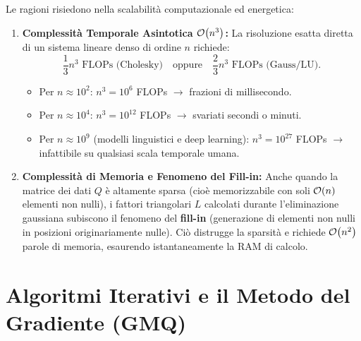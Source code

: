 Le ragioni risiedono nella scalabilit\`a computazionale ed energetica:
\begin{enumerate}
    \item \textbf{Complessit\`a Temporale Asintotica $\mathcal{O}\!\left(n^3\right)$:}
    La risoluzione esatta diretta di un sistema lineare denso di ordine $n$ richiede:
    \begin{equation}
        \frac{1}{3} n^3 \text{ FLOPs (Cholesky)} \quad \text{oppure} \quad \frac{2}{3} n^3 \text{ FLOPs (Gauss/LU)}.
    \end{equation}
    \begin{itemize}
        \item Per $n \approx 10^2$: $n^3 = 10^6$ FLOPs $\longrightarrow$ frazioni di millisecondo.
        \item Per $n \approx 10^4$: $n^3 = 10^{12}$ FLOPs $\longrightarrow$ svariati secondi o minuti.
        \item Per $n \approx 10^9$ (modelli linguistici e deep learning): $n^3 = 10^{27}$ FLOPs $\longrightarrow$ infattibile su qualsiasi scala temporale umana.
    \end{itemize}

    \item \textbf{Complessit\`a di Memoria e Fenomeno del Fill-in:}
    Anche quando la matrice dei dati $Q$ \`e altamente sparsa (cio\`e memorizzabile con soli $\mathcal{O}\!\left(n\right)$ elementi non nulli), i fattori triangolari $L$ calcolati durante l'eliminazione gaussiana subiscono il fenomeno del \textbf{fill-in} (generazione di elementi non nulli in posizioni originariamente nulle). Ci\`o distrugge la sparsit\`a e richiede $\mathcal{O}\!\left(n^2\right)$ parole di memoria, esaurendo istantaneamente la RAM di calcolo.
\end{enumerate}


\FloatBarrier
\section{Algoritmi Iterativi e il Metodo del Gradiente (GMQ)}
\label{sec:algoritmi-iterativi-gmq}

